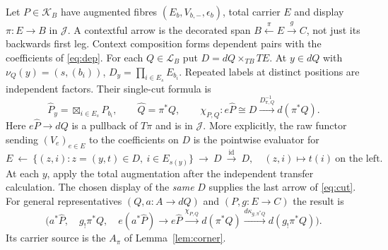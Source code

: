 \documentclass[11pt]{article}
\theoremstyle{definition}
\newcommand{\J}{\mathcal J}
\newcommand{\Lcat}{\mathcal L}
\newcommand{\Kcat}{\mathcal K}
\newcommand{\id}{\mathrm{id}}
\newcommand{\bx}{\mathop{\boxtimes}}
\begin{document}
Let $P\in\Kcat_B$ have augmented fibres $(E_b,V_{b,-},\epsilon_b)$,
total carrier $E$ and display $\pi:E\to B$ in $\J$.
A contextful arrow is the decorated span $B\xleftarrow{\pi}E\xrightarrow{g}C$,
not just its backwards first leg. Context composition forms dependent
pairs with the coefficients of \eqref{eq:dep}. For each $Q\in\Lcat_B$
put $D=dQ\times_{TB}TE$. At $y\in dQ$ with $\nu_Q(y)=(s,(b_i))$,
$D_y=\prod_{i\in E_s}E_{b_i}$. Repeated labels at distinct positions
are independent factors. Their single-cut formula is
\begin{equation}
 \widehat P_y=\bx_{i\in E_s}P_{b_i},\qquad
 \widehat Q=\pi^*Q,\qquad
 \chi_{P,Q}:e\widehat P\cong D\xrightarrow{D_{\pi,Q}^{-1}}d(\pi^*Q).
 \label{eq:cut}
\end{equation}
Here $e\widehat P\to dQ$ is a pullback of $T\pi$ and is in $\J$.
More explicitly, the raw functor sending $(V_e)_{e\in E}$ to the
coefficients on $D$ is the pointwise evaluator for
\[
 E\ \longleftarrow\ \{(z,i):z=(y,t)\in D,\ i\in E_{s(y)}\}
 \ \longrightarrow\ D\ \xrightarrow{\id}\ D,
 \quad (z,i)\longmapsto t(i)\ \text{on the left}.
\]
At each $y$, apply the total augmentation after the independent
transfer calculation. The chosen display of the \emph{same} $D$ supplies
the last arrow of \eqref{eq:cut}. For general representatives
$(Q,a:A\to dQ)$ and $(P,g:E\to C)$ the result is
\[
 \big(a^*\widehat P,\quad g_!\pi^*Q,\quad
 e(a^*\widehat P)\to e\widehat P\xrightarrow{\chi_{P,Q}}d(\pi^*Q)
                    \xrightarrow{d\kappa_{g,\pi^*Q}}d(g_!\pi^*Q)\big).
\]
Its carrier source is the $A_\pi$ of Lemma~\ref{lem:corner}.
\end{document}
